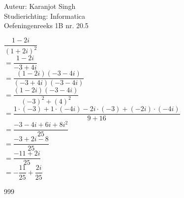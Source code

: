 \documentclass[a4paper]{article}
\begin{document}
	
\large Auteur: Karanjot Singh \\
\large Studierichting: Informatica \\
\large Oefeningenreeks 1B nr. 20.5 \\

\normalsize

$\dfrac{1 - 2i}{(1 + 2i)^2}$\\

$= \dfrac{1 - 2i}{-3 + 4i}$\\

$= \dfrac{(1 - 2i)(-3 - 4i)}{(-3 + 4i)(-3 - 4i)}$\\

$= \dfrac{(1 - 2i)(-3 - 4i)}{(-3)^2 + (4)^2}$\\

$= \dfrac{1 \cdot (-3) + 1 \cdot (-4i) - 2i \cdot (-3) + (-2i) \cdot (-4i)}{9 + 16}$\\

$= \dfrac{-3 - 4i + 6i + 8i^2}{25}$\\

$= \dfrac{-3 + 2i - 8}{25}$\\

$= \dfrac{-11 + 2i}{25}$\\

$= -\dfrac{11}{25} + \dfrac{2i}{25}$\\

\begin{thebibliography}{999}
\end{thebibliography}
	
\end{document}
